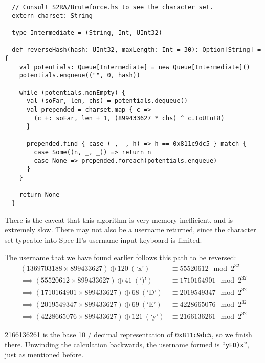 \documentclass[14pt,a4paper,notitlepage]{extarticle}
\begin{document}
                \begin{lstlisting}
  // Consult S2RA/Bruteforce.hs to see the character set.
  extern charset: String

  type Intermediate = (String, Int, UInt32)

  def reverseHash(hash: UInt32, maxLength: Int = 30): Option[String] = {
    val potentials: Queue[Intermediate] = new Queue[Intermediate]()
    potentials.enqueue(("", 0, hash))

    while (potentials.nonEmpty) {
      val (soFar, len, chs) = potentials.dequeue()
      val prepended = charset.map { c =>
        (c +: soFar, len + 1, (899433627 * chs) ^ c.toUInt8)
      }

      prepended.find { case (_, _, h) => h == 0x811c9dc5 } match {
        case Some((n, _, _)) => return n
        case None => prepended.foreach(potentials.enqueue)
      }
    }

    return None
  }
                \end{lstlisting}

                \noindent There is the caveat that this algorithm is very memory inefficient, and
                is extremely slow. There may not also be a username returned, since the character
                set typeable into Spec II's username input keyboard is limited.

                \noindent The username that we have found earlier follows this path to be reversed:
                \begin{align*}
                    (1369703188 \times 899433627) \oplus 120\ (\text{`x'}) &\equiv 55520612 \mod 2^{32}\\
                    \implies (55520612 \times 899433627) \oplus 41\ (\text{`)'}) &\equiv 1710164901 \mod 2^{32}\\
                    \implies (1710164901 \times 899433627) \oplus 68\ (\text{`D'}) &\equiv 2019549347 \mod 2^{32}\\
                    \implies (2019549347 \times 899433627) \oplus 69\ (\text{`E'}) &\equiv 4228665076 \mod 2^{32}\\
                    \implies (4228665076 \times 899433627) \oplus 121\ (\text{`y'}) &\equiv 2166136261 \mod 2^{32}
                \end{align*}

                2166136261 is the base 10 / decimal representation of \texttt{0x811c9dc5}, so we finish there.
                Unwinding the calculation backwards, the username formed is ``\texttt{yED)x}'', just as
                mentioned before.
\end{document}

